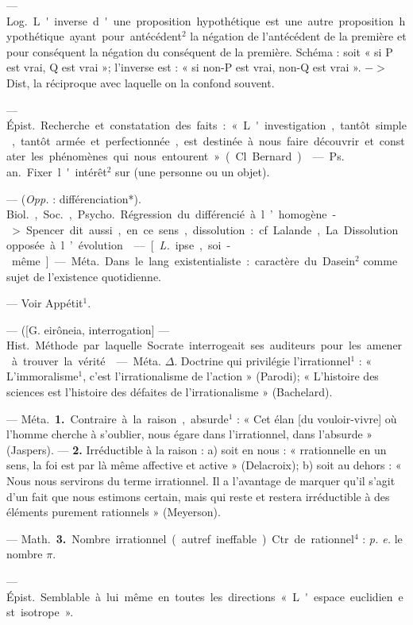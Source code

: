 \begin{itemize}[leftmargin=1cm, label=, itemsep=1pt]
 — \si{Log.} L'inverse d'une proposition
hypothétique est une autre
proposition hypothétique ayant pour
antécédent$^2$ la négation de l’antécédent
de la première et pour conséquent
la négation du conséquent
de la première. Schéma : soit « si P
est vrai, Q est vrai »; l'inverse est :
« si non-P est vrai, non-Q est vrai ».
$->$ Dist, la réciproque avec laquelle
on la confond souvent.

 — \si{Épist.} Recherche
et constatation des faits : « L'investigation,
tantôt simple, tantôt
armée et perfectionnée, est destinée
à nous faire découvrir et constater
les phénomènes qui nous entourent »
(Cl. Bernard).

 — \si{Ps. an.} Fixer l'intérêt$^2$
sur (une personne ou un objet).

 — ({\it Opp.} : différenciation*).
\si{Biol.}, \si{Soc.}, \si{Psycho.} Régression du
différencié à l’homogène. -> Spencer
dit aussi, en ce sens, dissolution :
cf. Lalande, La Dissolution opposée
à l’évolution.

 — [{\it L.} ipse, soi-même] — \si{Méta.}
Dans le lang. existentialiste : caractère
du Dasein$^2$ comme sujet de
l’existence quotidienne.

 — Voir Appétit$^1$.

 — ([G. eirôneia, interrogation] —
\si{Hist.} Méthode par laquelle Socrate
interrogeait ses auditeurs pour les
amener à trouver la vérité.

 — \si{Méta.} $\Delta$. Doctrine
qui privilégie l’irrationnel$^1$ : « L’immoralisme$^1$,
c’est l’irrationalisme de
l’action » (Parodi); « L’histoire des
sciences est l’histoire des défaites
de l’irrationalisme » (Bachelard).

 — \si{Méta.} {\bf 1.} Contraire à la
raison, absurde$^1$ : « Cet élan [du
vouloir-vivre] où l’homme cherche
à s’oublier, nous égare dans l’irrationnel,
dans l’absurde » (Jaspers).
— {\bf 2.} Irréductible à la raison : a) soit
en nous : « rrationnelle en un sens,
la foi est par là même affective et
active » (Delacroix); b) soit au
dehors : « Nous nous servirons du
terme irrationnel. Il a l'avantage de
marquer qu'il s’agit d’un fait que
nous estimons certain, mais qui reste
et restera irréductible à des éléments
purement rationnels » (Meyerson).

— \si{Math.} {\bf 3.} Nombre irrationnel
(autref. ineffable). Ctr. de rationnel$^4$ :
{\it p. e.} le nombre $\pi$.

 — \si{Épist.} Semblable à lui
même en toutes les directions
« L'espace euclidien est isotrope ».

	\end{itemize}
